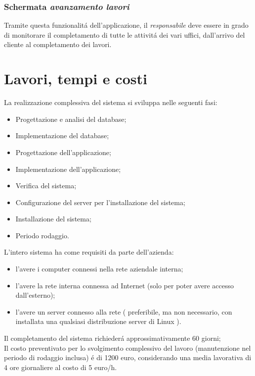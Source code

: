 \documentclass[paper=a4, fontsize=11pt]{scrartcl} %
\numberwithin{equation}{section} %
\numberwithin{figure}{section} %
\numberwithin{table}{section} %
\begin{document}
\subsubsection{Schermata \textit{avanzamento lavori}}

Tramite questa funzionalit\'a dell'applicazione, il \textit{responsabile}
deve essere in grado di monitorare il completamento di tutte le attivit\'a
dei vari uffici, dall'arrivo del cliente al completamento dei lavori.

\newpage
\section{Lavori, tempi e costi}

La realizzazione complessiva del sistema si sviluppa nelle seguenti fasi:
\begin{itemize}
\item Progettazione e analisi del database;
\item Implementazione del database;
\item Progettazione dell'applicazione;
\item Implementazione dell'applicazione;
\item Verifica del sistema;
\item Configurazione del server per l'installazione del sistema;
\item Installazione del sistema;
\item Periodo rodaggio.
\end{itemize}

L'intero sistema ha come requisiti da parte dell'azienda:
\begin{itemize}
\item l'avere i computer connessi nella rete aziendale interna;
\item l'avere la rete interna connessa ad Internet (solo per poter avere accesso dall'esterno);
\item l'avere un server connesso alla rete
( preferibile, ma non necessario, con installata una qualsiasi distribuzione server di Linux ).
\end{itemize}

Il completamento del sistema richieder\'a approssimativamente 60 giorni;\\
Il costo preventivato per lo svolgimento complessivo del lavoro (manutenzione nel periodo di rodaggio inclusa)
\'e di 1200 euro, considerando una media lavorativa di 4 ore giornaliere al costo di 5 euro/h.
\end{document}
